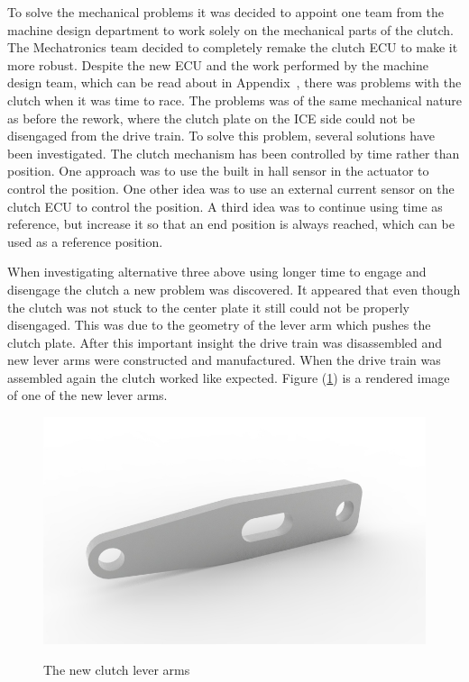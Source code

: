 To solve the mechanical problems it was decided to appoint one team from the
machine design department to work solely on the mechanical parts of the clutch.
The Mechatronics team decided to completely remake the clutch ECU to make it
more robust. Despite the new ECU and the work performed by the machine design
team, which can be read about in Appendix~\cite{MD_report}, there was problems
with the clutch when it was time to race. The problems was of the same
mechanical nature as before the rework, where the clutch plate on the ICE side
could not be disengaged from the drive train. To solve this problem, several
solutions have been investigated. The clutch mechanism has been controlled by
time rather than position. One approach was to use the built in hall sensor in
the actuator to control the position. One other idea was to use an external
current sensor on the clutch ECU to control the position. A third idea was to
continue using time as reference, but increase it so that an end position is
always reached, which can be used as a reference position.

When investigating alternative three above using longer time to engage and
disengage the clutch a new problem was discovered. It appeared that even though
the clutch was not stuck to the center plate it still could not be properly
disengaged. This was due to the geometry of the lever arm which pushes the
clutch plate.  After this important insight the drive train was disassembled and
new lever arms were constructed and manufactured. When the drive train was
assembled again the clutch worked like expected. Figure (\ref{fig:clutch}) is a
rendered image of one of the new lever arms.
\begin{figure}[H]
    \centering\label{fig:clutch}
    \includegraphics[width=1\textwidth]{./img/clutch}
    \caption{The new clutch lever arms}
\end{figure}

